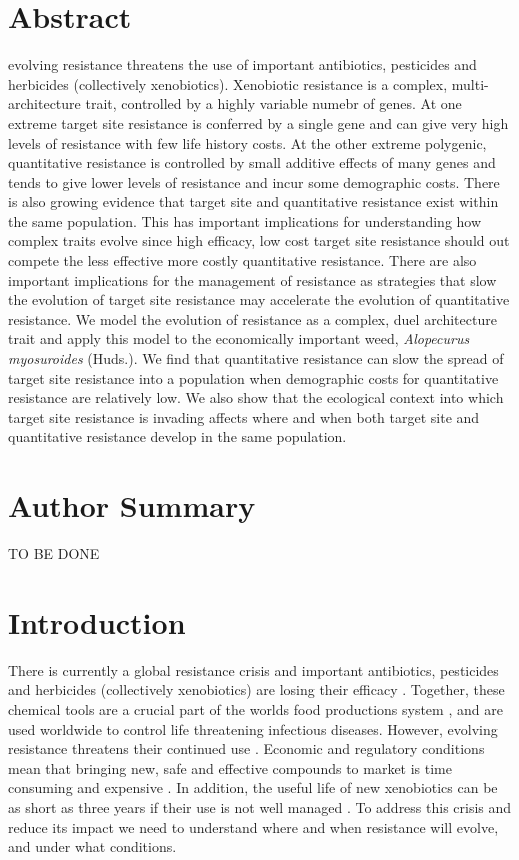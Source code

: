 \documentclass[10pt,letterpaper]{article}
\begin{document}
\section*{Abstract}
evolving resistance threatens the use of important antibiotics, pesticides and herbicides (collectively xenobiotics). Xenobiotic resistance is a complex, multi-architecture trait, controlled by a highly variable numebr of genes. At one extreme target site resistance is conferred by a single gene and can give very high levels of resistance with few life history costs. At the other extreme polygenic, quantitative resistance is controlled by small additive effects of many genes and tends to give lower levels of resistance and incur some demographic costs. There is also growing evidence that target site and quantitative resistance exist within the same population. This has important implications for understanding how complex traits evolve since high efficacy, low cost target site resistance should out compete the less effective more costly quantitative resistance. There are also important implications for the management of resistance as strategies that slow the evolution of target site resistance may accelerate the evolution of quantitative resistance. We model the evolution of resistance as a complex, duel architecture trait and apply this model to the economically important weed, \textit{Alopecurus myosuroides} (Huds.). We find that quantitative resistance can slow the spread of target site resistance into a population when demographic costs for quantitative resistance are relatively low. We also show that the ecological context into which target site resistance is invading affects where and when both target site and quantitative resistance develop in the same population.      

\section*{Author Summary}
TO BE DONE

\linenumbers

\section*{Introduction}
There is currently a global resistance crisis \cite{Serv2013, Ross2014} and important antibiotics, pesticides and herbicides (collectively xenobiotics) are losing their efficacy \cite{Palu2001}. Together, these chemical tools are a crucial part of the worlds food productions system \cite{Duke2012}, and are used worldwide to control life threatening infectious diseases. However, evolving resistance threatens their continued use \cite{Barb2011, Nkya2013}. Economic and regulatory conditions mean that bringing new, safe and effective compounds to market is time consuming and expensive \cite{Duke2012}. In addition, the useful life of new xenobiotics can be as short as three years if their use is not well managed \cite{Palu2001, Duke2012}. To address this crisis and reduce its impact we need to understand where and when resistance will evolve, and under what conditions. 
\end{document}
